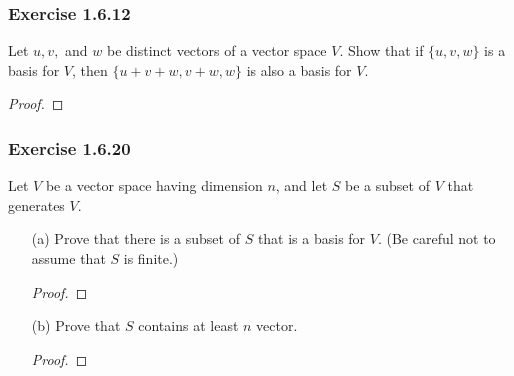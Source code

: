 \subsubsection{Exercise 1.6.12}
Let \( u,v,  \) and \( w  \) be distinct vectors of a vector space \( V  \). Show that if \( \{ u,v,w \}  \) is a basis for \( V  \), then \( \{ u + v   + w , v + w , w  \}  \) is also a basis for \( V  \). 
\begin{proof}

\end{proof}


\subsubsection{Exercise 1.6.20} Let \( V  \) be a vector space having dimension \( n  \), and let \( S  \) be a subset of \( V  \) that generates \( V  \).
\begin{enumerate}
    \item[(a)] Prove that there is a subset of \( S  \) that is a basis for \( V  \). (Be careful not to assume that \( S  \) is finite.)
        \begin{proof}
        
        \end{proof}
    \item[(b)] Prove that \( S  \) contains at least \( n  \) vector.
        \begin{proof}
        
        \end{proof}
\end{enumerate}
